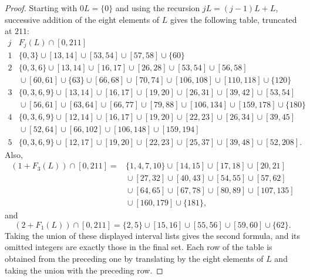 \documentclass[12pt]{article}
\theoremstyle{plain}
\theoremstyle{definition}
\theoremstyle{plain}
\begin{document}
\begin{proof}
Starting with $0L=\{0\}$ and using the recursion
$jL=(j-1)L+L$, successive addition of the eight elements of $L$ gives the
following table, truncated at $211$:
\[
\begin{array}{c|l}
j & F_j(L)\cap[0,211]\\
\hline
1 & \{0,3\}\cup[13,14]\cup[53,54]\cup[57,58]\cup\{60\}\\
2 & \{0,3,6\}\cup[13,14]\cup[16,17]\cup[26,28]\cup[53,54]\cup[56,58]\\
  & {}\cup[60,61]\cup\{63\}\cup[66,68]\cup[70,74]\cup[106,108]\cup[110,118]\cup\{120\}\\
3 & \{0,3,6,9\}\cup[13,14]\cup[16,17]\cup[19,20]\cup[26,31]\cup[39,42]\cup[53,54]\\
  & {}\cup[56,61]\cup[63,64]\cup[66,77]\cup[79,88]\cup[106,134]\cup[159,178]\cup\{180\}\\
4 & \{0,3,6,9\}\cup[12,14]\cup[16,17]\cup[19,20]\cup[22,23]\cup[26,34]\cup[39,45]\\
  & {}\cup[52,64]\cup[66,102]\cup[106,148]\cup[159,194]\\
5 & \{0,3,6,9\}\cup[12,17]\cup[19,20]\cup[22,23]\cup[25,37]\cup[39,48]\cup[52,208].
\end{array}
\]
Also,
\[
\begin{aligned}
(1+F_3(L))\cap[0,211]
={}&\{1,4,7,10\}\cup[14,15]\cup[17,18]\cup[20,21]\\
 &{}\cup[27,32]\cup[40,43]\cup[54,55]\cup[57,62]\\
 &{}\cup[64,65]\cup[67,78]\cup[80,89]\cup[107,135]\\
 &{}\cup[160,179]\cup\{181\},
\end{aligned}
\]
and
\[
 (2+F_1(L))\cap[0,211]
 =\{2,5\}\cup[15,16]\cup[55,56]\cup[59,60]\cup\{62\}.
\]
Taking the union of these displayed interval lists gives the second
formula, and its omitted integers are exactly those in the final set.
Each row of the table is obtained from the preceding one by translating
by the eight elements of $L$ and taking the union with the preceding row.
\end{proof}
\end{document}
